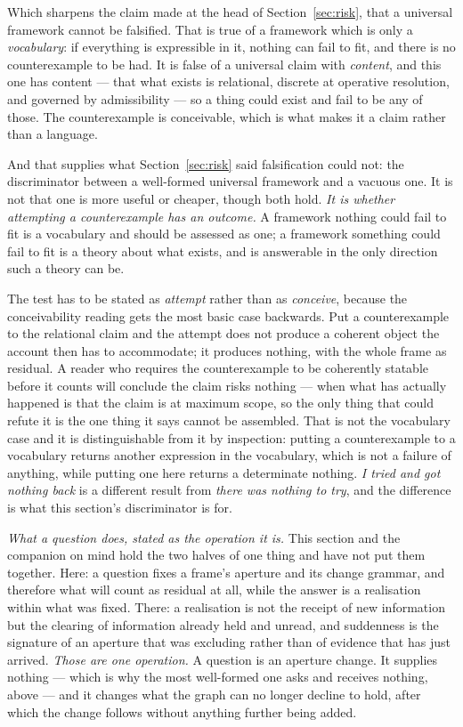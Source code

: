 \documentclass[11pt,a4paper]{article}
\theoremstyle{remark}\newtheorem{remark}[definition]{Remark}
\begin{document}
Which sharpens the claim made at the head of Section~\ref{sec:risk}, that a universal framework cannot be
falsified. That is true of a framework which is only a \emph{vocabulary}: if everything is expressible
in it, nothing can fail to fit, and there is no counterexample to be had. It is false of a universal
claim with \emph{content}, and this one has content --- that what exists is relational, discrete at
operative resolution, and governed by admissibility --- so a thing could exist and fail to be any of
those. The counterexample is conceivable, which is what makes it a claim rather than a language.

And that supplies what Section~\ref{sec:risk} said falsification could not: the discriminator between a
well-formed universal framework and a vacuous one. It is not that one is more useful or cheaper,
though both hold. \emph{It is whether attempting a counterexample has an outcome.} A framework nothing
could fail to fit is a vocabulary and should be assessed as one; a framework something could fail to
fit is a theory about what exists, and is answerable in the only direction such a theory can be.

The test has to be stated as \emph{attempt} rather than as \emph{conceive}, because the conceivability
reading gets the most basic case backwards. Put a counterexample to the relational claim and the
attempt does not produce a coherent object the account then has to accommodate; it produces nothing,
with the whole frame as residual. A reader who requires the counterexample to be coherently statable
before it counts will conclude the claim risks nothing --- when what has actually happened is that the
claim is at maximum scope, so the only thing that could refute it is the one thing it says cannot be
assembled. That is not the vocabulary case and it is distinguishable from it by inspection: putting a
counterexample to a vocabulary returns another expression in the vocabulary, which is not a failure of
anything, while putting one here returns a determinate nothing. \emph{I tried and got nothing back} is
a different result from \emph{there was nothing to try}, and the difference is what this section's
discriminator is for.

\emph{What a question does, stated as the operation it is.} This section and the companion on mind hold
the two halves of one thing and have not put them together. Here: a question fixes a frame's aperture
and its change grammar, and therefore what will count as residual at all, while the answer is a
realisation within what was fixed. There: a realisation is not the receipt of new information but the
clearing of information already held and unread, and suddenness is the signature of an aperture that
was excluding rather than of evidence that has just arrived. \emph{Those are one operation.} A question
is an aperture change. It supplies nothing --- which is why the most well-formed one asks and receives
nothing, above --- and it changes what the graph can no longer decline to hold, after which the change
follows without anything further being added.
\end{document}
